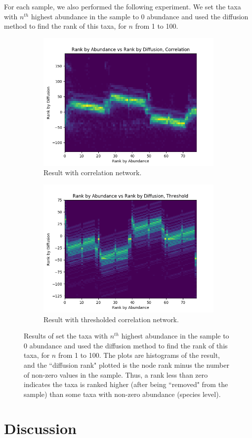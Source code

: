 \documentclass[10pt]{article}
\theoremstyle{definition}
\numberwithin{theorem}{section}
\numberwithin{definition}{section}
\numberwithin{lemma}{section}
\numberwithin{corollary}{section}
\numberwithin{clm}{section}
\numberwithin{rmk}{section}
\begin{document}
For each sample, we also performed the following experiment. We set the taxa with $n^{th}$ highest abundance in the sample to $0$ abundance and used the diffusion method to find the rank of this taxa, for $n$ from 1 to 100.

\begin{figure}
	\begin{subfigure}[h]{0.45\textwidth}
		\includegraphics[scale = 0.5]{../rank_v_rank_cor.png}
		\caption{Result with correlation network.}
	\end{subfigure}
	\begin{subfigure}[h]{0.45\textwidth}
	\includegraphics[scale = 0.5]{../rank_v_rank_thr.png}
	\caption{Result with thresholded correlation network.}
\end{subfigure}
\caption{Results of set the taxa with $n^{th}$ highest abundance in the sample to $0$ abundance and used the diffusion method to find the rank of this taxa, for $n$ from 1 to 100. The plots are histograms of the result, and the ``diffusion rank" plotted is the node rank minus the number of non-zero values in the sample. Thus, a rank less than zero indicates the taxa is ranked higher (after being ``removed" from the sample) than some taxa with non-zero abundance (species level).}
\end{figure}

\section{Discussion}



\end{document}
